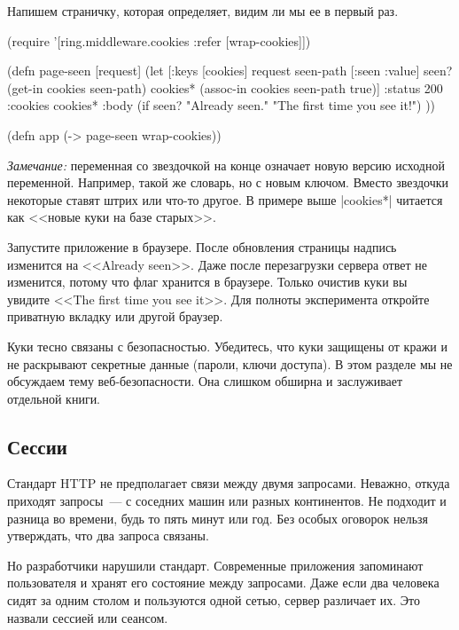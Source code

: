 Напишем страничку, которая определяет, видим ли мы ее в первый раз.

\begin{english}
  \begin{clojure}
(require '[ring.middleware.cookies
           :refer [wrap-cookies]])

(defn page-seen [request]
  (let [{:keys [cookies]} request
        seen-path [:seen :value]
        seen? (get-in cookies seen-path)
        cookies* (assoc-in cookies seen-path true)]
    {:status 200
     :cookies cookies*
     :body (if seen?
             "Already seen."
             "The first time you see it!") }))

(defn app (-> page-seen
              wrap-cookies))
  \end{clojure}
\end{english}

\emph{Замечание:} переменная со звездочкой на конце означает новую версию
исходной переменной. Например, такой же словарь, но с новым ключом. Вместо
звездочки некоторые ставят штрих или что-то другое. В примере выше
\spverb|cookies*| читается как <<новые куки на базе старых>>.

Запустите приложение в браузере. После обновления страницы надпись изменится на
<<Already seen>>. Даже после перезагрузки сервера ответ не изменится, потому что
флаг хранится в браузере. Только очистив куки вы увидите <<The first time
you see it>>. Для полноты эксперимента откройте приватную вкладку или другой
браузер.

Куки тесно связаны с безопасностью. Убедитесь, что куки защищены от кражи и не
раскрывают секретные данные (пароли, ключи доступа). В этом разделе мы не
обсуждаем тему веб-безопасности. Она слишком обширна и заслуживает отдельной
книги.

\subsection{Сессии}

Стандарт HTTP не предполагает связи между двумя запросами. Неважно, откуда
приходят запросы~--- с соседних машин или разных континентов. Не подходит и
разница во времени, будь то пять минут или год. Без особых оговорок нельзя
утверждать, что два запроса связаны.

Но разработчики нарушили стандарт. Современные приложения запоминают
пользователя и хранят его состояние между запросами. Даже если два человека
сидят за одним столом и пользуются одной сетью, сервер различает их. Это назвали
сессией или сеансом.

